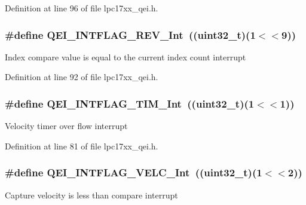 \-Definition at line 96 of file lpc17xx\-\_\-qei.\-h.

\hypertarget{group___q_e_i___public___macros_ga042d69dbabf2d5ae7ed9deea776aea9c}{
\subsubsection[{\-Q\-E\-I\-\_\-\-I\-N\-T\-F\-L\-A\-G\-\_\-\-R\-E\-V\-\_\-\-Int}]{\setlength{\rightskip}{0pt plus 5cm}\#define {\bf \-Q\-E\-I\-\_\-\-I\-N\-T\-F\-L\-A\-G\-\_\-\-R\-E\-V\-\_\-\-Int}~((uint32\-\_\-t)(1$<$$<$9))}}\label{group___q_e_i___public___macros_ga042d69dbabf2d5ae7ed9deea776aea9c}
\-Index compare value is equal to the current index count interrupt 

\-Definition at line 92 of file lpc17xx\-\_\-qei.\-h.

\hypertarget{group___q_e_i___public___macros_gae9a04ea4d7c71518fd734830ecc1433d}{
\subsubsection[{\-Q\-E\-I\-\_\-\-I\-N\-T\-F\-L\-A\-G\-\_\-\-T\-I\-M\-\_\-\-Int}]{\setlength{\rightskip}{0pt plus 5cm}\#define {\bf \-Q\-E\-I\-\_\-\-I\-N\-T\-F\-L\-A\-G\-\_\-\-T\-I\-M\-\_\-\-Int}~((uint32\-\_\-t)(1$<$$<$1))}}\label{group___q_e_i___public___macros_gae9a04ea4d7c71518fd734830ecc1433d}
\-Velocity timer over flow interrupt 

\-Definition at line 81 of file lpc17xx\-\_\-qei.\-h.

\hypertarget{group___q_e_i___public___macros_gaf91e6f6ad66d24fcda8d0e531746a4d6}{
\subsubsection[{\-Q\-E\-I\-\_\-\-I\-N\-T\-F\-L\-A\-G\-\_\-\-V\-E\-L\-C\-\_\-\-Int}]{\setlength{\rightskip}{0pt plus 5cm}\#define {\bf \-Q\-E\-I\-\_\-\-I\-N\-T\-F\-L\-A\-G\-\_\-\-V\-E\-L\-C\-\_\-\-Int}~((uint32\-\_\-t)(1$<$$<$2))}}\label{group___q_e_i___public___macros_gaf91e6f6ad66d24fcda8d0e531746a4d6}
\-Capture velocity is less than compare interrupt 

